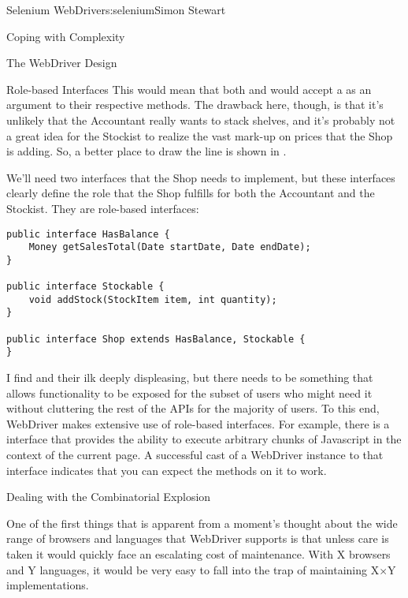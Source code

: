 \begin{aosachapter}{Selenium WebDriver}{s:selenium}{Simon Stewart}
\begin{aosasect1}{Coping with Complexity}
\begin{aosasect2}{The WebDriver Design}
\begin{aosabox}{Role-based Interfaces}
This would mean that both  and  would
accept a  as an argument to their respective methods. The
drawback here, though, is that it's unlikely that the Accountant
really wants to stack shelves, and it's probably not a great idea for
the Stockist to realize the vast mark-up on prices that the Shop is
adding. So, a better place to draw the line is shown in
.

We'll need two interfaces that the Shop needs to implement, but these
interfaces clearly define the role that the Shop fulfills for both the
Accountant and the Stockist. They are role-based interfaces:

\begin{verbatim}
public interface HasBalance {
    Money getSalesTotal(Date startDate, Date endDate);
}

public interface Stockable {
    void addStock(StockItem item, int quantity);
}

public interface Shop extends HasBalance, Stockable {
}
\end{verbatim}
\end{aosabox}

I find  and their ilk deeply
displeasing, but there needs to be something that allows functionality
to be exposed for the subset of users who might need it without
cluttering the rest of the APIs for the majority of users. To this
end, WebDriver makes extensive use of role-based interfaces. For
example, there is a  interface that provides
the ability to execute arbitrary chunks of Javascript in the context
of the current page. A successful cast of a WebDriver instance to that
interface indicates that you can expect the methods on it to work.



\end{aosasect2}

\begin{aosasect2}{Dealing with the Combinatorial Explosion}

One of the first things that is apparent from a moment's thought about
the wide range of browsers and languages that WebDriver supports is
that unless care is taken it would quickly face an escalating cost of
maintenance. With X browsers and Y languages, it would be very easy to
fall into the trap of maintaining X${\times}$Y implementations.


\end{aosasect2}
\end{aosasect1}
\end{aosachapter}
